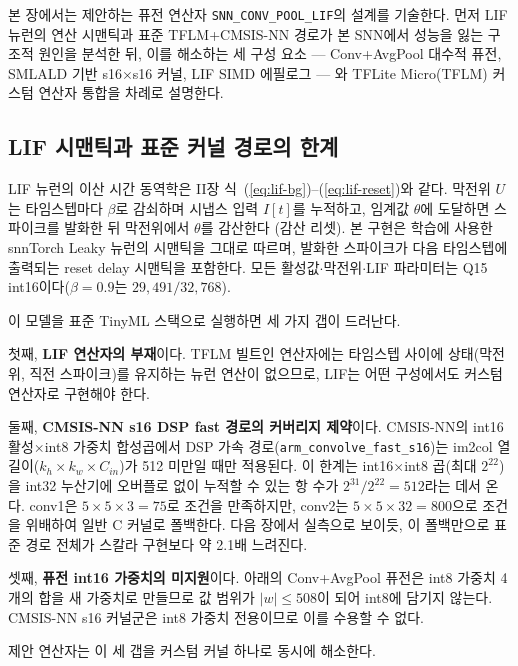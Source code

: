\label{sec:fusion}

본 장에서는 제안하는 퓨전 연산자 \texttt{SNN\_CONV\_POOL\_LIF}의 설계를
기술한다. 먼저 LIF 뉴런의 연산 시맨틱과 표준 TFLM+CMSIS-NN 경로가 본
SNN에서 성능을 잃는 구조적 원인을 분석한 뒤, 이를 해소하는 세 구성 요소
--- Conv+AvgPool 대수적 퓨전, SMLALD 기반 s16$\times$s16 커널, LIF SIMD
에필로그 --- 와 TFLite Micro(TFLM) 커스텀 연산자 통합을 차례로 설명한다.

\subsection{LIF 시맨틱과 표준 커널 경로의 한계}

LIF 뉴런의 이산 시간 동역학은 II장
식~(\ref{eq:lif-bg})--(\ref{eq:lif-reset})와 같다. 막전위 $U$는
타임스텝마다 $\beta$로 감쇠하며 시냅스 입력 $I[t]$를 누적하고, 임계값
$\theta$에 도달하면 스파이크를 발화한 뒤 막전위에서 $\theta$를 감산한다
(감산 리셋). 본 구현은 학습에 사용한 snnTorch Leaky
뉴런\cite{eshraghian2023training}의 시맨틱을 그대로 따르며, 발화한
스파이크가 다음 타임스텝에 출력되는 reset delay 시맨틱을 포함한다. 모든
활성값$\cdot$막전위$\cdot$LIF 파라미터는 Q15 int16이다($\beta=0.9$는
$29{,}491/32{,}768$).

이 모델을 표준 TinyML 스택으로 실행하면 세 가지 갭이 드러난다.

첫째, \textbf{LIF 연산자의 부재}이다. TFLM 빌트인 연산자에는 타임스텝
사이에 상태(막전위, 직전 스파이크)를 유지하는 뉴런 연산이 없으므로,
LIF는 어떤 구성에서도 커스텀 연산자로 구현해야 한다.

둘째, \textbf{CMSIS-NN s16 DSP fast 경로의 커버리지 제약}이다.
CMSIS-NN\cite{lai2018cmsisnn}의 int16 활성$\times$int8 가중치
합성곱에서 DSP 가속 경로(\texttt{arm\_convolve\_fast\_s16})는 im2col
열 길이($k_h \times k_w \times C_{in}$)가 512 미만일 때만 적용된다. 이
한계는 int16$\times$int8 곱(최대 $2^{22}$)을 int32 누산기에 오버플로
없이 누적할 수 있는 항 수가 $2^{31}/2^{22}=512$라는 데서 온다. conv1은
$5\times5\times3=75$로 조건을 만족하지만, conv2는
$5\times5\times32=800$으로 조건을 위배하여 일반 C 커널로 폴백한다.
다음 장에서 실측으로 보이듯, 이 폴백만으로 표준 경로 전체가 스칼라
구현보다 약 2.1배 느려진다.

셋째, \textbf{퓨전 int16 가중치의 미지원}이다. 아래의 Conv+AvgPool
퓨전은 int8 가중치 4개의 합을 새 가중치로 만들므로 값 범위가
$|w|\le508$이 되어 int8에 담기지 않는다. CMSIS-NN s16 커널군은 int8
가중치 전용이므로 이를 수용할 수 없다.

제안 연산자는 이 세 갭을 커스텀 커널 하나로 동시에 해소한다.

